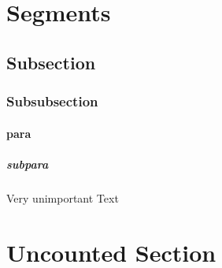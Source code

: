 \section{Segments}
\subsection{Subsection}
\subsubsection{Subsubsection}
\paragraph{para}
\subparagraph{subpara}
Very unimportant Text

\section*{Uncounted Section}

